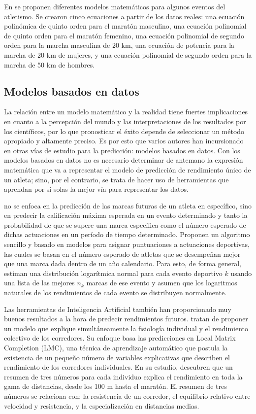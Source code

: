En \cite{galvanmathematical} se proponen diferentes modelos matemáticos para algunos eventos del atletismo. Se crearon cinco ecuaciones a partir de los datos reales: una ecuación polinómica de quinto orden para el maratón masculino, una ecuación polinomial de quinto orden para el maratón femenino, una ecuación polinomial de segundo orden para la marcha masculina de 20 km, una ecuación de potencia para la marcha de 20 km de mujeres, y una ecuación polinomial de segundo orden para la marcha de 50 km de hombres.

\subsection{Modelos basados en datos}

La relación entre un modelo matemático y la realidad tiene fuertes implicaciones en cuanto a la percepción del mundo y las interpretaciones de los resultados por los científicos, por lo que pronosticar el éxito depende de seleccionar un método apropiado y altamente preciso. Es por esto que varios autores han incursionado en otras vías de estudio para la predicción: modelos basados en datos. Con los modelos basados en datos no es necesario determinar de antemano la expresión matemática que va a representar el modelo de predicción de rendimiento único de un atleta; sino, por el contrario, se trata de hacer uso de herramientas que aprendan por si solas la mejor vía para representar los datos.

\cite{godsey2012brian} no se enfoca en la predicción de las marcas futuras de un atleta en específico, sino en predecir la calificación máxima esperada en un evento determinado y tanto la probabilidad de que se supere una marca específica como el número esperado de dichas actuaciones en un período de tiempo determinado. Proponen un algoritmo sencillo y basado en modelos para asignar puntuaciones a actuaciones deportivas, las cuales se basan en el número esperado de atletas que se desempeñan mejor que una marca dada dentro de un año calendario. Para esto, de forma general, estiman una distribución logarítmica normal para cada evento deportivo $k$ usando una lista de las mejores $n_k$ marcas de ese evento y asumen que los logaritmos naturales de los rendimientos de cada evento se distribuyen normalmente.

Las herramientas de Inteligencia Artificial también han proporcionado muy buenos resultados a la hora de predecir rendimientos futuros. \cite{blythe2016prediction} tratan de proponer un modelo que explique simultáneamente la fisiología individual y el rendimiento colectivo de los corredores. Su enfoque basa las predicciones en Local Matrix Completion (LMC), una técnica de aprendizaje automático que postula la existencia de un pequeño número de variables explicativas que describen el rendimiento de los corredores individuales. En su estudio, descubren que un resumen de tres números para cada individuo explica el rendimiento en toda la gama de distancias, desde los 100 m hasta el maratón. El resumen de tres números se relaciona con: la resistencia de un corredor, el equilibrio relativo entre velocidad y resistencia, y la especialización en distancias medias.

